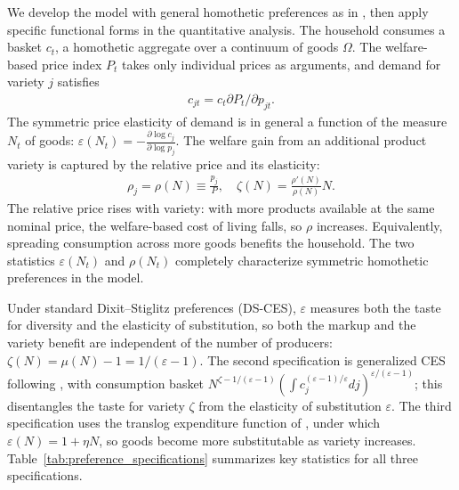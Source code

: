 \documentclass[authoryear, review, 12pt]{elsarticle}
\newcommand{\der}[2]{\frac{\partial #1}{\partial #2}}
\begin{document}
	We develop the model with general homothetic preferences as in 
	\citet{bilbiie_2012}, then apply specific functional forms in the 
	quantitative analysis. The household consumes a basket $c_t$, a 
	homothetic aggregate over a continuum of goods $\Omega$. The 
	welfare-based price index $P_t$ takes only individual prices as 
	arguments, and demand for variety $j$ satisfies
	\begin{align}\label{eq:demand}
		c_{jt}=c_t\partial P_t/\partial p_{jt}.
	\end{align}
	The symmetric price elasticity of demand is in general a function 
	of the measure $N_t$ of goods:
		$\varepsilon(N_t)=-\der{\log c_{j}}{\log p_{j}}$.
	The welfare gain from an additional product variety is captured by 
	the relative price and its elasticity:
	\begin{align}\label{eq:relative_price}
		\rho_{j}=\rho(N)\equiv \frac{p_{j}}{P},\quad 
		\zeta(N)=\frac{\rho'(N)}{\rho(N)}N.
	\end{align}
	The relative price rises with variety: with more products available 
	at the same nominal price, the welfare-based cost of living falls, 
	so $\rho$ increases. Equivalently, spreading consumption across 
	more goods benefits the household. The two statistics 
	$\varepsilon(N_t)$ and $\rho(N_t)$ completely characterize 
	symmetric homothetic preferences in the model.
	
	Under standard Dixit--Stiglitz preferences (DS-CES), $\varepsilon$ 
	measures both the taste for diversity and the elasticity of 
	substitution, so both the markup and the variety benefit are 
	independent of the number of producers: 
	$\zeta(N)=\mu(N)-1=1/(\varepsilon-1)$. The second specification 
	is generalized CES following \citet{benassy_1996}, with consumption 
	basket $N^{\zeta-1/(\varepsilon-1)}\left(\int 
	c_j^{(\varepsilon-1)/\varepsilon}dj\right)^{\varepsilon/(\varepsilon-1)}$; 
	this disentangles the taste for variety $\zeta$ from the elasticity 
	of substitution $\varepsilon$. The third specification uses the 
	translog expenditure function of \citet{feenstra_2003}, under which 
	$\varepsilon(N)=1+\eta N$, so goods become more substitutable as 
	variety increases. Table~\ref{tab:preference_specifications} summarizes 
	key statistics for all three specifications.
	
\end{document}
